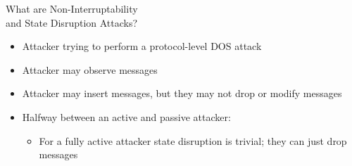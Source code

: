 
\begin{frame}{What are Non-Interruptability\\and State Disruption Attacks?}
      \begin{itemize}
        \item Attacker trying to perform a protocol-level DOS attack
        \item Attacker may observe messages
        \item Attacker may insert messages, but they may not drop or modify messages
        \item Halfway between an active and passive attacker:
        \begin{itemize}
        \item For a fully active attacker state disruption is trivial; they can just drop messages
        \end{itemize}
      \end{itemize}
%
\end{frame}

